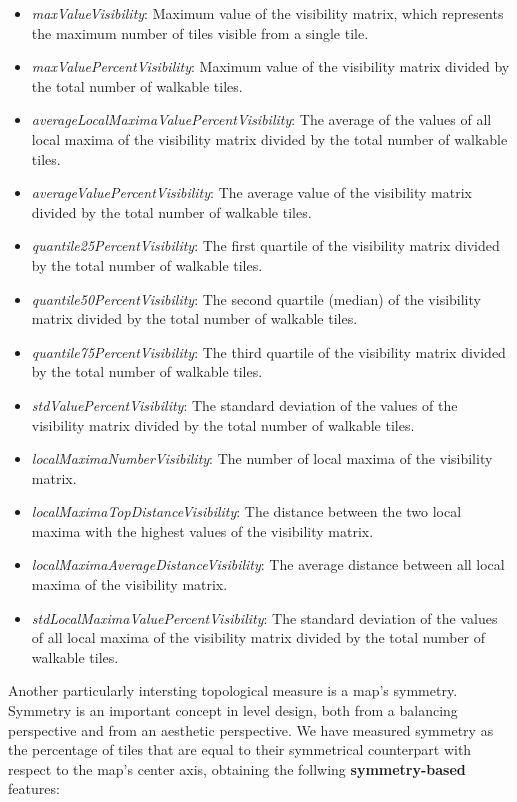 \documentclass{Configuration_Files/PoliMi3i_thesis}
\begin{document}
\begin{itemize}
    \item \textit{maxValueVisibility}: Maximum value of the visibility matrix, which represents the maximum number of tiles visible from a single tile.
    \item \textit{maxValuePercentVisibility}: Maximum value of the visibility matrix divided by the total number of walkable tiles.
    \item \textit{averageLocalMaximaValuePercentVisibility}: The average of the values of all local maxima of the visibility matrix divided by the total number of walkable tiles.
    \item \textit{averageValuePercentVisibility}: The average value of the visibility matrix divided by the total number of walkable tiles.
    \item \textit{quantile25PercentVisibility}: The first quartile of the visibility matrix divided by the total number of walkable tiles.
    \item \textit{quantile50PercentVisibility}: The second quartile (median) of the visibility matrix divided by the total number of walkable tiles.
    \item \textit{quantile75PercentVisibility}: The third quartile of the visibility matrix divided by the total number of walkable tiles.
    \item \textit{stdValuePercentVisibility}: The standard deviation of the values of the visibility matrix divided by the total number of walkable tiles.
    \item \textit{localMaximaNumberVisibility}: The number of local maxima of the visibility matrix.
    \item \textit{localMaximaTopDistanceVisibility}: The distance between the two local maxima with the highest values of the visibility matrix.
    \item \textit{localMaximaAverageDistanceVisibility}: The average distance between all local maxima of the visibility matrix.
    \item \textit{stdLocalMaximaValuePercentVisibility}: The standard deviation of the values of all local maxima of the visibility matrix divided by the total number of walkable tiles.
\end{itemize}

Another particularly intersting topological measure is a map's symmetry. Symmetry is an important concept in level design, both from a balancing perspective and from an aesthetic perspective. We have measured symmetry as the percentage of tiles that are equal to their symmetrical counterpart with respect to the map's center axis, obtaining the follwing \textbf{symmetry-based} features:
\end{document}
